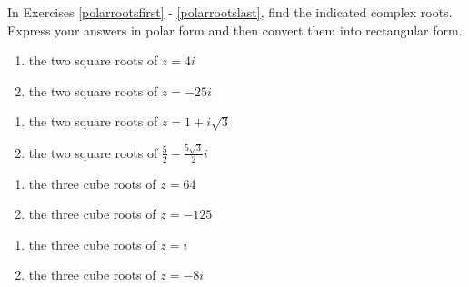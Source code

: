 \documentclass{ximera}
\begin{document}
In Exercises \ref{polarrootsfirst} - \ref{polarrootslast}, find the indicated complex roots.  Express your answers in polar form and then convert them into rectangular form.

\begin{multicols}{2}

\begin{enumerate}

\setcounter{enumi}{\value{HW}}

\item the two square roots of $z = 4i$ \label{polarrootsfirst}
\item the two square roots of $z = -25i$

\setcounter{HW}{\value{enumi}}

\end{enumerate}

\end{multicols}

\begin{multicols}{2} 

\begin{enumerate}

\setcounter{enumi}{\value{HW}}

\item the two square roots of $z = 1 + i\sqrt{3}$
\item the two square roots of $\frac{5}{2} - \frac{5\sqrt{3}}{2}i$

\setcounter{HW}{\value{enumi}}

\end{enumerate}

\end{multicols}

\begin{multicols}{2} 

\begin{enumerate}

\setcounter{enumi}{\value{HW}}

\item  the three cube roots of $z=64$
\item  the three cube roots of $z = -125$

\setcounter{HW}{\value{enumi}}

\end{enumerate}

\end{multicols}

\begin{multicols}{2} 

\begin{enumerate}

\setcounter{enumi}{\value{HW}}

\item  the three cube roots of $z = i$
\item  the three cube roots of $z = -8i$

\setcounter{HW}{\value{enumi}}

\end{enumerate}

\end{multicols}
\end{document}

